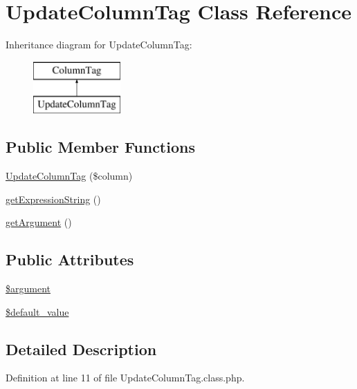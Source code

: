 \hypertarget{classUpdateColumnTag}{\section{Update\+Column\+Tag Class Reference}
\label{classUpdateColumnTag}
}
Inheritance diagram for Update\+Column\+Tag\+:\begin{figure}[H]
\begin{center}
\leavevmode
\includegraphics[height=2.000000cm]{classUpdateColumnTag}
\end{center}
\end{figure}
\subsection*{Public Member Functions}
\begin{DoxyCompactItemize}
\item 
\hyperlink{classUpdateColumnTag_a08118f413b38890ca779e44974447854}{Update\+Column\+Tag} (\$column)
\item 
\hyperlink{classUpdateColumnTag_a16ab982f05143f8e0c4550f02ebe2357}{get\+Expression\+String} ()
\item 
\hyperlink{classUpdateColumnTag_a6b6cca5c598d435f3f40caf96f5dea4a}{get\+Argument} ()
\end{DoxyCompactItemize}
\subsection*{Public Attributes}
\begin{DoxyCompactItemize}
\item 
\hyperlink{classUpdateColumnTag_a3312163ccabc7246e2f397390648b75b}{\$argument}
\item 
\hyperlink{classUpdateColumnTag_a63420aa5c0b8c374a4f29d054abbda76}{\$default\+\_\+value}
\end{DoxyCompactItemize}


\subsection{Detailed Description}


Definition at line 11 of file Update\+Column\+Tag.\+class.\+php.



